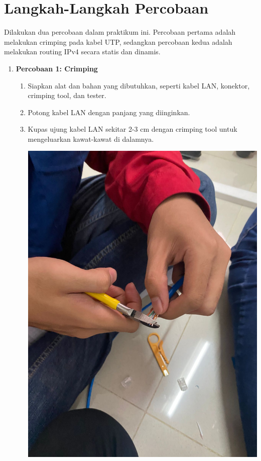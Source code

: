 \section{Langkah-Langkah Percobaan}
Dilakukan dua percobaan dalam praktikum ini. Percobaan pertama adalah melakukan 
crimping pada kabel UTP, sedangkan percobaan kedua adalah melakukan routing 
IPv4 secara statis dan dinamis.

\begin{enumerate}
    \item \textbf{Percobaan 1: Crimping}
    \begin{enumerate}
        \item Siapkan alat dan bahan yang dibutuhkan, seperti 
        kabel LAN, konektor, crimping tool, dan tester.
        \item Potong kabel LAN dengan panjang yang diinginkan.
        \item Kupas ujung kabel LAN sekitar 2-3 cm dengan 
        crimping tool untuk mengeluarkan kawat-kawat di dalamnya.
        \begin{center}
		    \includegraphics[scale=0.1]{P1/img/1-5.jpg}

\end{center}
\end{enumerate}
\end{enumerate}
